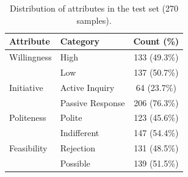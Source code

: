 \begin{table}[t]
\centering
\small
\setlength{\tabcolsep}{4pt}
\begin{tabular}{p{2.4cm} p{3cm} c}
\toprule
\textbf{Attribute} & \textbf{Category} & \textbf{Count (\%)} \\
\midrule
Willingness 
& High  & 133 (49.3\%) \\
& Low   & 137 (50.7\%) \\
\midrule
Initiative 
& Active Inquiry   & 64  (23.7\%) \\
& Passive Response & 206 (76.3\%) \\
\midrule
Politeness 
& Polite   & 123 (45.6\%) \\
& Indifferent & 147 (54.4\%) \\
\midrule
Feasibility 
& Rejection & 131 (48.5\%) \\
& Possible  & 139 (51.5\%) \\
\bottomrule
\end{tabular}
\caption{Distribution of attributes in the test set (270 samples).}
\label{tab:test_distribution}
\end{table}